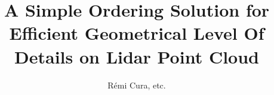 
	

\title{ A Simple Ordering Solution for Efficient Geometrical Level Of Details on Lidar Point Cloud}
\author{R\'emi Cura, etc.}



\maketitle
\newpage
 


	
	\newpage

	
	\newpage

	
	\newpage
	
	
	\newpage

	
	\newpage
 
	
	\newpage

	
	\newpage

%	
%


%	
%		
%
%	 	
%		





